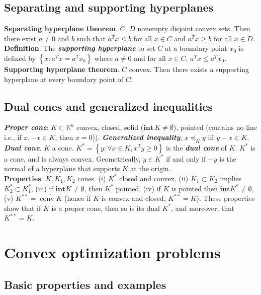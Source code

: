 \documentclass[a4paper, 11pt, twocolumn, landscape]{article}
\theoremstyle{lemma-style}
\theoremstyle{thm-style}
\theoremstyle{prop-style}
\theoremstyle{cor-style}
\newcommand{\Rn}{\mathbb{R}^{n}}
\DeclareMathOperator{\conv}{conv}
\renewcommand{\emph}[1]{\textbf{\textit{#1}}}
\begin{document}
\begin{small}
\vspace{-10pt}
	\subsection{Separating and supporting hyperplanes}

\textbf{Separating hyperplane theorem}. $C$, $D$ nonempty disjoint convex sets. Then there exist $a \neq 0$ and $b$ such that $a^{T}x \leq b$ for all $x \in C$ and $a^{T}x \geq b$ for all $x \in D$. \\
\textbf{Definition}. The \emph{supporting hyperplane} to set $C$ at a boundary point $x_{0}$ is defined by $\left\{ x: a^{T}x = a^{T}x_{0} \right\}$ where $a \neq 0$ and for all $x \in C$, $a^{T}x \leq a^{T}x_{0}$. \\
\textbf{Supporting hyperplane theorem}. $C$ convex. Then there exists a supporting hyperplane at every boundary point of $C$.

\vspace{-10pt}
	\subsection{Dual cones and generalized inequalities}

\emph{Proper cone}: $K \subset \Rn$ convex, closed, solid ($\mathbf{int}\, K \neq \emptyset$), pointed (contains no line i.e., if $x, -x \in K$, then $x = 0$)). \emph{Generalized inequality}, $x \preceq_{K} y$ iff $y - x \in K$. \\
\emph{Dual cone}. $K$ a cone. $K^{*} = \left\{ y: \forall x \in K, x^{T}y \geq 0 \right\}$ is the \emph{dual cone} of $K$. $K^{*}$ is a cone, and is always convex. Geometrically, $y \in K^{*}$ if and only if $-y$ is the normal of a hyperplane that supports $K$ at the origin. \\
\textbf{Properties}. $K, K_{1}, K_{2}$ cones. (i) $K^{*}$ closed and convex, (ii) $K_{1} \subset K_{2}$ implies $K_{2}^{*} \subset K_{1}^{*}$, (iii) if $\mathbf{int} K \neq \emptyset$, then $K^{*}$ pointed, (iv) if $\overline{K}$ is pointed then $\mathbf{int} K^{*} \neq \emptyset$, (v) $K^{**} = \overline{\conv K}$ (hence if $K$ is convex and closed, $K^{**} = K$). These properties show that if $K$ is a proper cone, then so is its dual $K^{*}$, and moreover, that $K^{**} = K$.

\section{Convex optimization problems}
    \subsection{Basic properties and examples}


\end{small}
\end{document}
